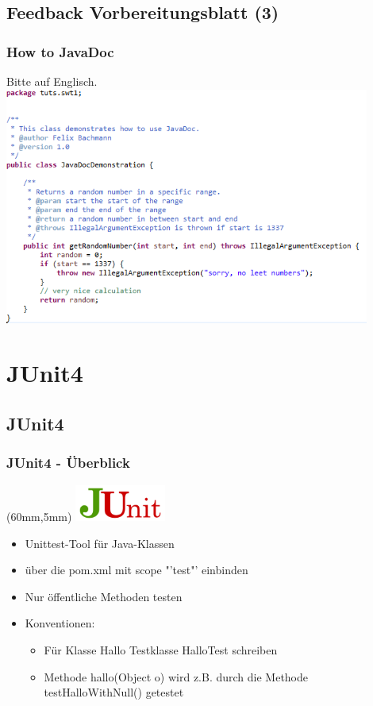 \documentclass[18pt]{beamer}
\begin{document}
	\subsection{Feedback Vorbereitungsblatt (3)}
	\begin{frame}
		\frametitle{How to JavaDoc}
		Bitte auf Englisch.
		\includegraphics[width=0.9\textwidth, scale=1.0]{./pics/tut0/javadoc-demo.png}
	\end{frame}
			
\section{JUnit4}	
	\subsection{JUnit4}
	\begin{frame}
		\frametitle{JUnit4 - Überblick}
		\begin{textblock*}{20mm}(60mm,5mm)
			\includegraphics[width=30mm, scale=0.8]{./pics/tut0/junit-logo.png}
		\end{textblock*}
		\begin{itemize}
			\item Unittest-Tool für Java-Klassen
			\item über die pom.xml mit scope "'test"' einbinden
			\item Nur öffentliche Methoden testen
			\item Konventionen:
			 \begin{itemize}
			 		\item Für Klasse Hallo Testklasse HalloTest schreiben
			 		\item Methode hallo(Object o) wird z.B. durch die Methode testHalloWithNull() getestet
			 \end{itemize}
		\end{itemize}
	\end{frame}	
	
\end{document}
